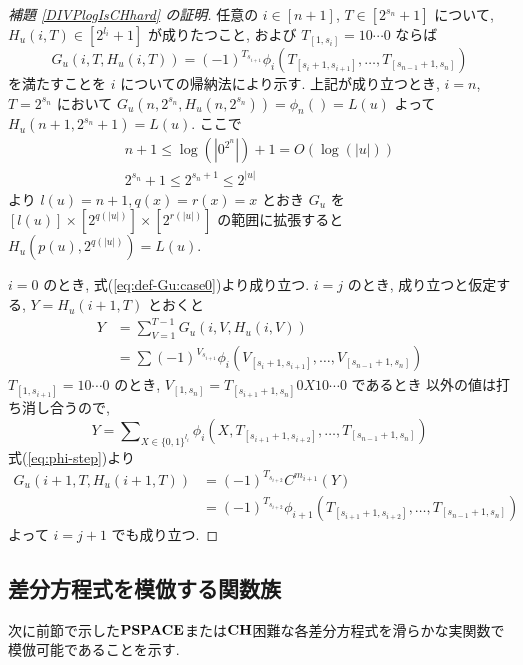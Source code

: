 \begin{proof}[\rm 補題 \ref{DIVPlogIsCHhard} の証明]
 任意の $i \in [n+1]$, $T \in [2^{s_n}+1]$ について,
 $H_u(i,T) \in [2^{l_i}+1]$ が成りたつこと,
 および $T_{[1,s_i]} = 10 \cdots 0$ ならば
 \begin{equation} \label{eq:subformula}
  G_u(i,T,H_u(i,T)) = (-1)^{T_{s_{i+1}}} 
   \phi_i(T_{[s_i+1, s_{i+1}]}, \dots, T_{[s_{n-1}+1, s_n]})
 \end{equation}
 を満たすことを $i$ についての帰納法により示す.
 上記が成り立つとき,
 $i=n$, $T=2^{s_n}$ において $G_u(n, 2^{s_n}, H_u(n,2^{s_n})) = \phi_n() = L(u)$
 よって $H_u(n+1, 2^{s_n}+1) = L(u)$.
 ここで 
 \begin{gather}
  n+1 \le \log(|0^{2^n}|) + 1 = O(\log(|u|)) \\
  2^{s_n}+1 \le 2^{s_n+1} \le 2^{|u|}
 \end{gather}
 より $l(u) = n+1, q(x) = r(x) = x$ とおき $G_u$ を
 $[l(u)] \times [2^{q(|u|)}] \times [2^{r(|u|)}]$ の範囲に拡張すると
 $H_u(p(u), 2^{q(|u|)}) = L(u)$.

 $i=0$ のとき, 式(\ref{eq:def-Gu:case0})より成り立つ.
 $i=j$ のとき, 成り立つと仮定する, $Y = H_u(i+1, T)$ とおくと
 \begin{align}
  Y 
  &= \sum_{V = 1}^{T-1} G_u(i, V, H_u(i, V)) \\
  &= \sum (-1)^{V_{s_{i+1}}} \phi_i(V_{[s_i+1, s_{i+1}]}, 
   \dots, V_{[s_{n-1}+1, s_n]})
 \end{align}
 $T_{[1, s_{i+1}]} = 10 \cdots 0$ のとき,
 $V_{[1, s_n]} = T_{[s_{i+1}+1,s_n]} 0 X 1 0 \cdots 0$ であるとき
 以外の値は打ち消し合うので,
 \begin{equation}
  Y = \sum\nolimits_{X \in \{0,1\}^{l_i}} 
  \phi_i(X, T_{[s_{i+1}+1, s_{i+2}]}, \dots, T_{[s_{n-1}+1, s_n]})
 \end{equation}
 式(\ref{eq:phi-step})より
 \begin{align}
  G_u(i+1,T,H_u(i+1,T)) 
  &= (-1)^{T_{s_{i+2}}} C^{m_{i+1}} (Y)\\
  &= (-1)^{T_{s_{i+2}}} \phi_{i+1}(T_{[s_{i+1}+1, s_{i+2}]}, \dots, T_{[s_{n-1}+1, s_n]})
 \end{align}
 よって $i=j+1$ でも成り立つ.
 \end{proof}



\subsection{差分方程式を模倣する関数族}
\label{subsection: ode family}
次に前節で示した$\mathbf{PSPACE}$または$\mathbf{CH}$困難な各差分方程式を滑らかな実関数で模倣可能であることを示す.


